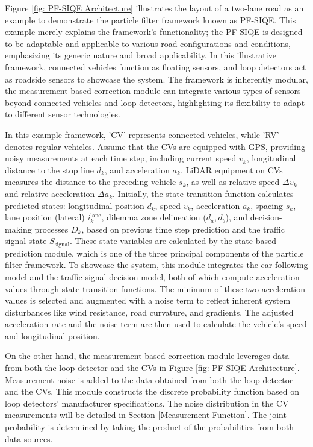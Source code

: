 Figure \ref{fig: PF-SIQE Architecture} illustrates the layout of a two-lane road as an example to demonstrate the particle filter framework known as PF-SIQE. This example merely explains the framework's functionality; the PF-SIQE is designed to be adaptable and applicable to various road configurations and conditions, emphasizing its generic nature and broad applicability. In this illustrative framework, connected vehicles function as floating sensors, and loop detectors act as roadside sensors to showcase the system. The framework is inherently modular, the measurement-based correction module can integrate various types of sensors beyond connected vehicles and loop detectors, highlighting its flexibility to adapt to different sensor technologies.

In this example framework, 'CV' represents connected vehicles, while 'RV' denotes regular vehicles. Assume that the CVs are equipped with GPS, providing noisy measurements at each time step, including current speed $v_k$, longitudinal distance to the stop line $d_k$, and acceleration $a_k$. LiDAR equipment on CVs measures the distance to the preceding vehicle $s_k$, as well as relative speed $\Delta v_k$ and relative acceleration $\Delta a_k$. Initially, the state transition function calculates predicted states: longitudinal position $d_{k}$, speed $v_k$, acceleration $a_k$, spacing $s_k$, lane position (lateral) $i_k^{\text{lane}}$, dilemma zone delineation ($d_a, d_b$), and decision-making processes $D_{k}$, based on previous time step prediction and the traffic signal state $S_{\text{signal}}$. These state variables are calculated by the state-based prediction module, which is one of the three principal components of the particle filter framework. To showcase the system, this module integrates the car-following model and the traffic signal decision model, both of which compute acceleration values through state transition functions. The minimum of these two acceleration values is selected and augmented with a noise term to reflect inherent system disturbances like wind resistance, road curvature, and gradients. The adjusted acceleration rate and the noise term are then used to calculate the vehicle’s speed and longitudinal position.

On the other hand, the measurement-based correction module leverages data from both the loop detector and the CVs in Figure \ref{fig: PF-SIQE Architecture}. Measurement noise is added to the data obtained from both the loop detector and the CVs. This module constructs the discrete probability function based on loop detectors' manufacturer specifications. The noise distribution in the CV measurements will be detailed in Section \ref{Measurement Function}. The joint probability is determined by taking the product of the probabilities from both data sources.

